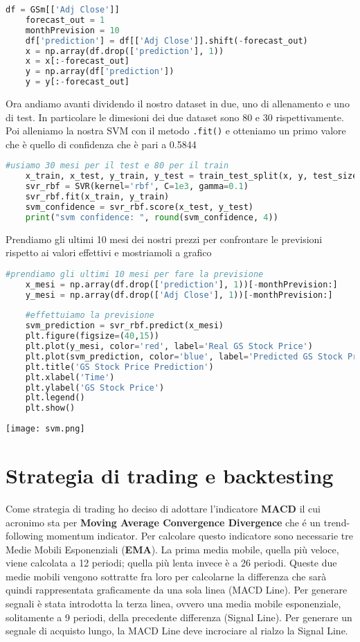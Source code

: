 \documentclass{report}
\begin{document}
\begin{lstlisting}[language=python]
    df = GSm[['Adj Close']]
    forecast_out = 1
    monthPrevision = 10
    df['prediction'] = df[['Adj Close']].shift(-forecast_out)
    x = np.array(df.drop(['prediction'], 1))
    x = x[:-forecast_out]
    y = np.array(df['prediction'])
    y = y[:-forecast_out]
\end{lstlisting}

Ora andiamo avanti dividendo il nostro dataset in due, uno di allenamento e uno di test. In particolare le dimesioni dei due dataset sono 80 e 30 rispettivamente. Poi alleniamo la nostra SVM con il metodo \lstinline{.fit()} e otteniamo un primo valore che è quello di confidenza che è pari a \num{0.5844}

\begin{lstlisting}[language=python]
    #usiamo 30 mesi per il test e 80 per il train
    x_train, x_test, y_train, y_test = train_test_split(x, y, test_size=30, train_size=80)
    svr_rbf = SVR(kernel='rbf', C=1e3, gamma=0.1)
    svr_rbf.fit(x_train, y_train)
    svm_confidence = svr_rbf.score(x_test, y_test)
    print("svm confidence: ", round(svm_confidence, 4))
\end{lstlisting}

Prendiamo gli ultimi 10 mesi dei nostri prezzi per confrontare le previsioni rispetto ai valori effettivi e mostriamoli a grafico

\begin{lstlisting}[language=python]
    #prendiamo gli ultimi 10 mesi per fare la previsione
    x_mesi = np.array(df.drop(['prediction'], 1))[-monthPrevision:]
    y_mesi = np.array(df.drop(['Adj Close'], 1))[-monthPrevision:]
    
    #effettuiamo la previsione
    svm_prediction = svr_rbf.predict(x_mesi)
    plt.figure(figsize=(40,15))
    plt.plot(y_mesi, color='red', label='Real GS Stock Price')
    plt.plot(svm_prediction, color='blue', label='Predicted GS Stock Price')
    plt.title('GS Stock Price Prediction')
    plt.xlabel('Time')
    plt.ylabel('GS Stock Price')
    plt.legend()
    plt.show()
\end{lstlisting}
\texttt{[image: svm.png]}

\chapter{Strategia di trading e backtesting}
Come strategia di trading ho deciso di adottare l'indicatore \textbf{MACD} il cui acronimo sta per \textbf{Moving Average Convergence Divergence} che é un trend-following momentum indicator. Per calcolare questo indicatore sono necessarie tre Medie Mobili Esponenziali (\textbf{EMA}). La prima media mobile, quella più veloce, viene calcolata a 12 periodi; quella più lenta invece è a 26 periodi. Queste due medie mobili vengono sottratte fra loro per calcolarne la differenza che sarà quindi rappresentata graficamente da una sola linea (MACD Line). Per generare segnali è stata introdotta la terza linea, ovvero una media mobile esponenziale, solitamente a 9 periodi, della precedente differenza (Signal Line). Per generare un segnale di acquisto lungo, la MACD Line deve incrociare al rialzo la Signal Line.
\end{document}
